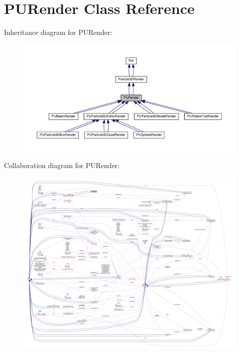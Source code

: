 \hypertarget{classPURender}{}\section{P\+U\+Render Class Reference}
\label{classPURender}


Inheritance diagram for P\+U\+Render\+:
\nopagebreak
\begin{figure}[H]
\begin{center}
\leavevmode
\includegraphics[width=350pt]{classPURender__inherit__graph}
\end{center}
\end{figure}


Collaboration diagram for P\+U\+Render\+:
\nopagebreak
\begin{figure}[H]
\begin{center}
\leavevmode
\includegraphics[width=350pt]{classPURender__coll__graph}
\end{center}
\end{figure}
